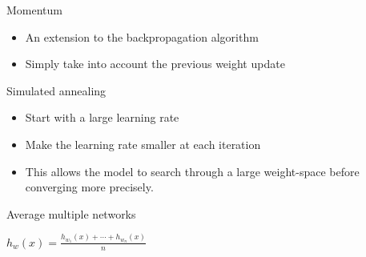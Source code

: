 \begin{frame}[c]{Momentum}
  \begin{itemize}
    \item An extension to the backpropagation algorithm
    \item Simply take into account the previous weight update
  \end{itemize}
\end{frame}

\begin{frame}{Simulated annealing}
\begin{itemize}
  \item Start with a large learning rate
  \item Make the learning rate smaller at each iteration
  \item This allows the model to search through a large weight-space before
  converging more precisely.
\end{itemize}
\end{frame}

\begin{frame}{Average multiple networks}
\begin{center}
  \Large{$h_w(x) = \frac{h_{w_1}(x) + \cdots + h_{w_n}(x)}{n}$}
\end{center}
\end{frame}

